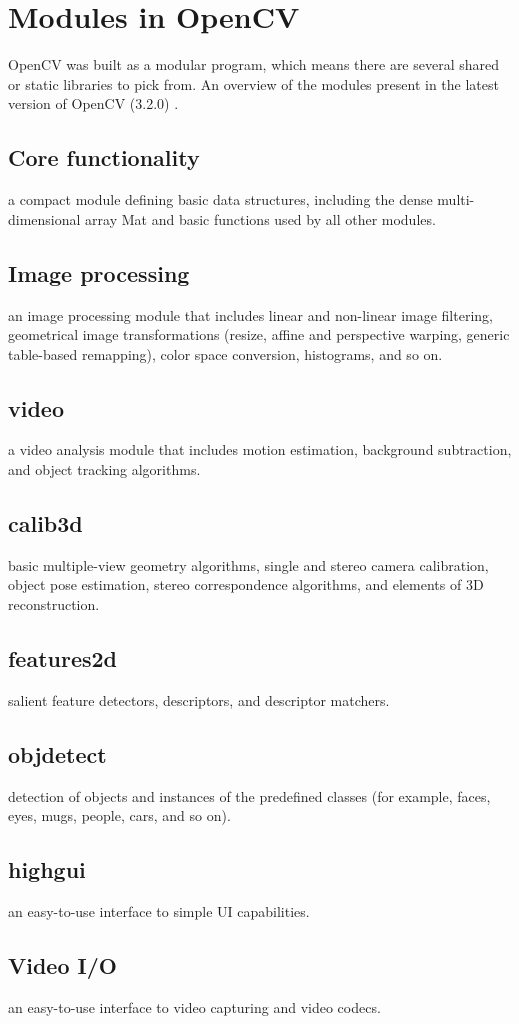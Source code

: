 \documentclass[9pt,twocolumn,twoside]{../../styles/osajnl}
\begin{document}
\section{Modules in OpenCV}
OpenCV was built as a modular program, which means there are several shared or static libraries to pick from. An overview of the modules present in the latest version of OpenCV (3.2.0) \cite{www-opencv-intro}.
\subsection{Core functionality} a compact module defining basic data structures, including the dense multi-dimensional array Mat and basic functions used by all other modules.
\subsection{Image processing} an image processing module that includes linear and non-linear image filtering, geometrical image transformations (resize, affine and perspective warping, generic table-based remapping), color space conversion, histograms, and so on.
\subsection{video} a video analysis module that includes motion estimation, background subtraction, and object tracking algorithms.
\subsection{calib3d} basic multiple-view geometry algorithms, single and stereo camera calibration, object pose estimation, stereo correspondence algorithms, and elements of 3D reconstruction.
\subsection{features2d} salient feature detectors, descriptors, and descriptor matchers.
\subsection{objdetect} detection of objects and instances of the predefined classes (for example, faces, eyes, mugs, people, cars, and so on).
\subsection{highgui} an easy-to-use interface to simple UI capabilities.
\subsection{Video I/O} an easy-to-use interface to video capturing and video codecs.
\end{document}
